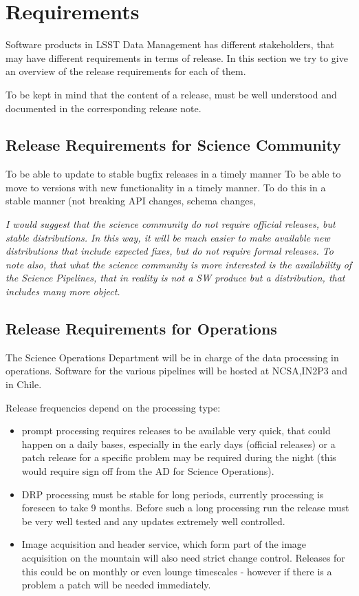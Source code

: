 \section{Requirements} \label{sec:reqs}

Software products in \gls{LSST} Data Management has different stakeholders, that may have different requirements in terms of release.
In this section we try to give an overview of the release requirements for each of them.

To be kept in mind that the content of a release, must be well understood and documented in the corresponding release note.


\subsection{Release Requirements for Science Community } \label{sec:comreqs}

To be able to update to stable bugfix releases in a timely manner
To be able to move to versions with new functionality in a timely manner.
To do this in a stable manner (not breaking \gls{API} changes, schema changes,

\textit{ I would suggest that the science community do not require official releases, but stable distributions.
In this way, it will be much easier to make available new distributions that include expected fixes,
but do not require formal releases.
To note also, that what the science community is more interested is the availability of the Science Pipelines,
that in reality is not a \gls{SW} produce but a distribution, that includes many more object.  }

\subsection{Release Requirements for Operations} \label{sec:procreqs}

The Science Operations Department will be  in charge  of the data processing in operations. Software for the various pipelines
will be hosted at \gls{NCSA},IN2P3 and in Chile.

Release frequencies depend on the processing type:

\begin{itemize}
\item prompt processing requires releases to be available very quick, that could happen on a daily bases, especially in the early days (official releases)
 or a  patch release  for a specific problem may be required during the night (this would require sign off from the \gls{AD} for Science Operations).
\item \gls{DRP} processing  must be stable for long periods, currently processing is foreseen to take 9 months.  Before such a long processing run the release must be very well tested and any updates extremely well controlled.
\item Image acquisition and header service, which form part of the image acquisition on the mountain will also need strict change control. Releases for this could be on monthly or even lounge timescales - however if there is a problem a patch will be needed immediately.
\end{itemize}

